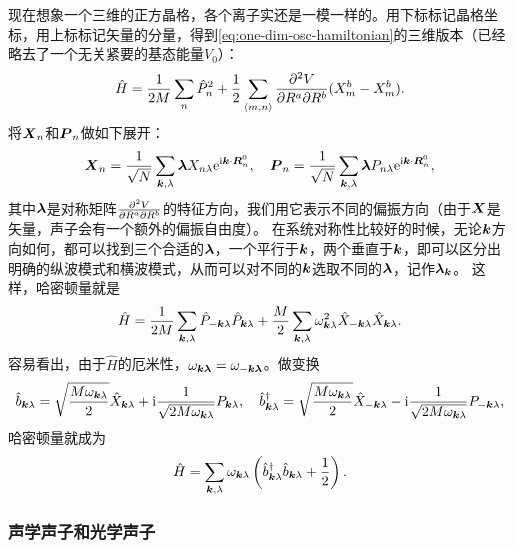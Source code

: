 \documentclass[hyperref, UTF8, a4paper]{ctexart}
\newcommand*{\ii}{\mathrm{i}}
\newcommand*{\ee}{\mathrm{e}}
\newcommand*{\pair}[1]{\langle #1 \rangle}
\begin{document}
现在想象一个三维的正方晶格，各个离子实还是一模一样的。用下标标记晶格坐标，用上标标记矢量的分量，得到\eqref{eq:one-dim-osc-hamiltonian}的三维版本（已经略去了一个无关紧要的基态能量$V_0$）：
\begin{equation}
    \hat{H} = \frac{1}{2 M} \sum_n \hat{P}_n^2 + \frac{1}{2} \sum_{\pair{m, n}} \pdv{V}{R^a}{R^b} (X_m^a - X_n^a) (X_m^b - X_m^b).
\end{equation}
将$\vb*{X}_n$和$\vb*{P}_n$做如下展开：
\begin{equation}
    \vb*{X}_n = \frac{1}{\sqrt{N}} \sum_{\vb*{k}, \lambda} \vb*{\lambda} X_{n \lambda} \ee^{\ii \vb*{k} \cdot \vb*{R}_n^0}, \quad \vb*{P}_n = \frac{1}{\sqrt{N}} \sum_{\vb*{k}, \lambda} \vb*{\lambda} P_{n \lambda} \ee^{\ii \vb*{k} \cdot \vb*{R}_n^0},
\end{equation}
其中$\vb*{\lambda}$是对称矩阵$\pdv{V}{R^a}{R^b}$的特征方向，我们用它表示不同的偏振方向（由于$\vb*{X}$是矢量，声子会有一个额外的偏振自由度）。
在系统对称性比较好的时候，无论$\vb*{k}$方向如何，都可以找到三个合适的$\vb*{\lambda}$，一个平行于$\vb*{k}$，两个垂直于$\vb*{k}$，即可以区分出明确的纵波模式和横波模式，从而可以对不同的$\vb*{k}$选取不同的$\vb*{\lambda}$，记作$\vb*{\lambda}_{\vb*{k}}$。
这样，哈密顿量就是
\begin{equation}
    \hat{H} = \frac{1}{2 M} \sum_{\vb*{k}, \lambda} \hat{P}_{-\vb*{k} \lambda} \hat{P}_{\vb*{k}\lambda} + \frac{M}{2} \sum_{\vb*{k}, \lambda} \omega_{\vb*{k} \lambda}^2 \hat{X}_{-\vb*{k} \lambda} \hat{X}_{\vb*{k} \lambda}.
\end{equation}
容易看出，由于$\hat{H}$的厄米性，$\omega_{\vb*{k}\vb*{\lambda}} = \omega_{-\vb*{k} \vb*{\lambda}}$。做变换
\begin{equation}
    \hat{b}_{\vb*{k} \lambda} = \sqrt{\frac{M \omega_{\vb*{k} \lambda}}{2}} \hat{X}_{\vb*{k} \lambda} + \ii \frac{1}{\sqrt{2 M \omega_{\vb*{k} \lambda}}} P_{\vb*{k} \lambda}, \quad \hat{b}^\dagger_{\vb*{k} \lambda} = \sqrt{\frac{M \omega_{\vb*{k} \lambda}}{2}} \hat{X}_{- \vb*{k} \lambda} - \ii \frac{1}{\sqrt{2 M \omega_{\vb*{k} \lambda}}} P_{- \vb*{k} \lambda},
    \label{eq:transform-b-pq}
\end{equation}
哈密顿量就成为
\begin{equation}
    \hat{H} = \sum_{\vb*{k}, \lambda} \omega_{\vb*{k} \lambda} \left( \hat{b}^\dagger_{\vb*{k} \lambda} \hat{b}_{\vb*{k} \lambda} + \frac{1}{2} \right).
\end{equation}

\subsubsection{声学声子和光学声子}
\end{document}

